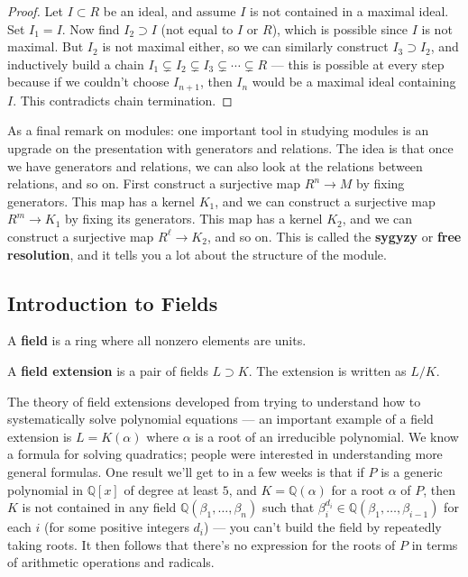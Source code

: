 \begin{proof}
    Let $I \subset R$ be an ideal, and assume $I$ is not contained in a maximal ideal. Set $I_1 = I$. Now find $I_2 \supset I$ (not equal to $I$ or $R$), which is possible since $I$ is not maximal. But $I_2$ is not maximal either, so we can similarly construct $I_3 \supset I_2$, and inductively build a chain $I_1 \subsetneq I_2 \subsetneq I_3 \subsetneq \cdots \subsetneq R$ --- this is possible at every step because if we couldn't choose $I_{n + 1}$, then $I_n$ would be a maximal ideal containing $I$. This contradicts chain termination. 
\end{proof}

\begin{note}
    As a final remark on modules: one important tool in studying modules is an upgrade on the presentation with generators and relations. The idea is that once we have generators and relations, we can also look at the relations between relations, and so on. First construct a surjective map $R^n \to M$ by fixing generators. This map has a kernel $K_1$, and we can construct a surjective map $R^m \to K_1$ by fixing its generators. This map has a kernel $K_2$, and we can construct a surjective map $R^\ell \to K_2$, and so on. This is called the \textbf{sygyzy} or \textbf{free resolution}, and it tells you a lot about the structure of the module.
\end{note}

\subsection{Introduction to Fields}

\vspace{0.75em}

\begin{definition}
A \textbf{field} is a ring where all nonzero elements are units. 
\end{definition}

\begin{definition}
    A \textbf{field extension} is a pair of fields $L \supset K$. The extension is written as $L/K$. 
\end{definition}

The theory of field extensions developed from trying to understand how to systematically solve polynomial equations --- an important example of a field extension is $L = K(\alpha)$ where $\alpha$ is a root of an irreducible polynomial. We know a formula for solving quadratics; people were interested in understanding more general formulas. One result we'll get to in a few weeks is that if $P$ is a generic polynomial in $\mathbb{Q}[x]$ of degree at least $5$, and $K = \mathbb{Q}(\alpha)$ for a root $\alpha$ of $P$, then $K$ is not contained in any field $\mathbb{Q}(\beta_1, \ldots, \beta_n)$ such that $\beta_i^{d_i} \in \mathbb{Q}(\beta_1, \ldots, \beta_{i - 1})$ for each $i$ (for some positive integers $d_i$) --- you can't build the field by repeatedly taking roots. It then follows that there's no expression for the roots of $P$ in terms of arithmetic operations and radicals.  

